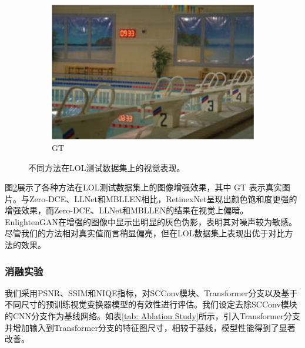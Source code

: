 \documentclass[a4paper]{ctexart}
\begin{document}
\begin{figure}[htb]
\begin{subfigure}{0.19\textwidth}
			\includegraphics[width=\linewidth]{picture/LLIE/Efficent/GT}
			\captionsetup{font=scriptsize}
			\caption{GT}
			\label{fig: GT}	
		\end{subfigure}
		\caption{
			\label{fig: LOL}
			不同方法在LOL测试数据集上的视觉表现。
		}
	\end{figure}
	
	图\ref{fig: LOL}展示了各种方法在LOL测试数据集上的图像增强效果，其中 GT 表示真实图片。与Zero-DCE、LLNet和MBLLEN相比，RetinexNet呈现出颜色饱和度更强的增强效果，而Zero-DCE、LLNet和MBLLEN的结果在视觉上偏暗。EnlightenGAN在增强的图像中显示出明显的灰色伪影，表明其对噪声较为敏感。尽管我们的方法相对真实值而言稍显偏亮，但在LOL数据集上表现出优于对比方法的效果。
	
	\subsubsection{消融实验}
	
	我们采用PSNR、SSIM和NIQE指标，对SCConv模块、Transformer分支以及基于不同尺寸的预训练视觉变换器模型的有效性进行评估。我们设定去除SCConv模块的CNN分支作为基线网络。如表\ref{tab: Ablation Study}所示，引入Transformer分支并增加输入到Transformer分支的特征图尺寸，相较于基线，模型性能得到了显著改善。
	
\end{document}
